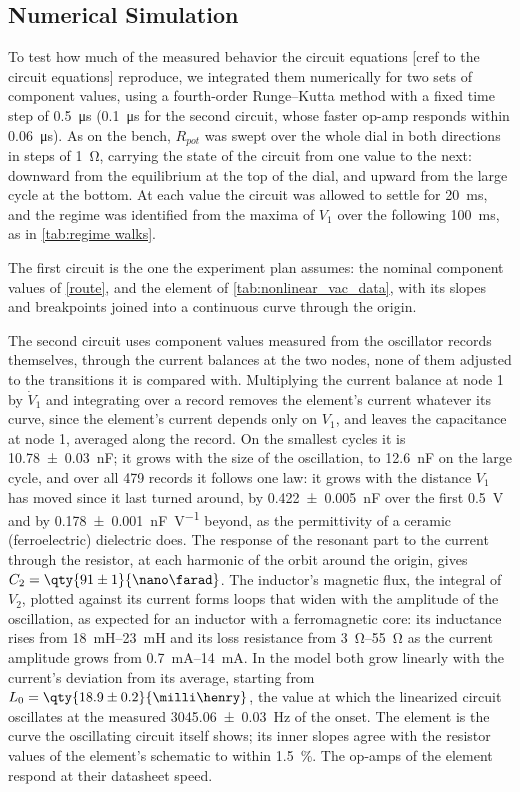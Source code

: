 \subsection{Numerical Simulation}\label{simulation}
To test how much of the measured behavior the circuit equations [cref to the circuit equations] reproduce, we integrated them numerically for two sets of component values, using a fourth-order Runge--Kutta method with a fixed time step of \qty{0.5}{\micro\second} (\qty{0.1}{\micro\second} for the second circuit, whose faster op-amp responds within \qty{0.06}{\micro\second}). As on the bench, $R_{pot}$ was swept over the whole dial in both directions in steps of \qty{1}{\ohm}, carrying the state of the circuit from one value to the next: downward from the equilibrium at the top of the dial, and upward from the large cycle at the bottom. At each value the circuit was allowed to settle for \qty{20}{\milli\second}, and the regime was identified from the maxima of $V_1$ over the following \qty{100}{\milli\second}, as in \cref{tab:regime walks}.

The first circuit is the one the experiment plan assumes: the nominal component values of \cref{route}, and the element of \cref{tab:nonlinear_vac_data}, with its slopes and breakpoints joined into a continuous curve through the origin.

The second circuit uses component values measured from the oscillator records themselves, through the current balances at the two nodes, none of them adjusted to the transitions it is compared with. Multiplying the current balance at node 1 by $\dot V_1$ and integrating over a record removes the element's current whatever its curve, since the element's current depends only on $V_1$, and leaves the capacitance at node 1, averaged along the record. On the smallest cycles it is \qty{10.78\pm0.03}{\nano\farad}; it grows with the size of the oscillation, to \qty{12.6}{\nano\farad} on the large cycle, and over all 479 records it follows one law: it grows with the distance $V_1$ has moved since it last turned around, by \qty{0.422\pm0.005}{\nano\farad} over the first \qty{0.5}{\volt} and by \qty{0.178\pm0.001}{\nano\farad\per\volt} beyond, as the permittivity of a ceramic (ferroelectric) dielectric does. The response of the resonant part to the current through the resistor, at each harmonic of the orbit around the origin, gives $C_2=\qty{91\pm1}{\nano\farad}$. The inductor's magnetic flux, the integral of $V_2$, plotted against its current forms loops that widen with the amplitude of the oscillation, as expected for an inductor with a ferromagnetic core: its inductance rises from \qtyrange{18}{23}{\milli\henry} and its loss resistance from \qtyrange{3}{55}{\ohm} as the current amplitude grows from \qtyrange{0.7}{14}{\milli\ampere}. In the model both grow linearly with the current's deviation from its average, starting from $L_0=\qty{18.9\pm0.2}{\milli\henry}$, the value at which the linearized circuit oscillates at the measured \qty{3045.06\pm0.03}{\hertz} of the onset. The element is the curve the oscillating circuit itself shows; its inner slopes agree with the resistor values of the element's schematic to within \qty{1.5}{\percent}. The op-amps of the element respond at their datasheet speed.

